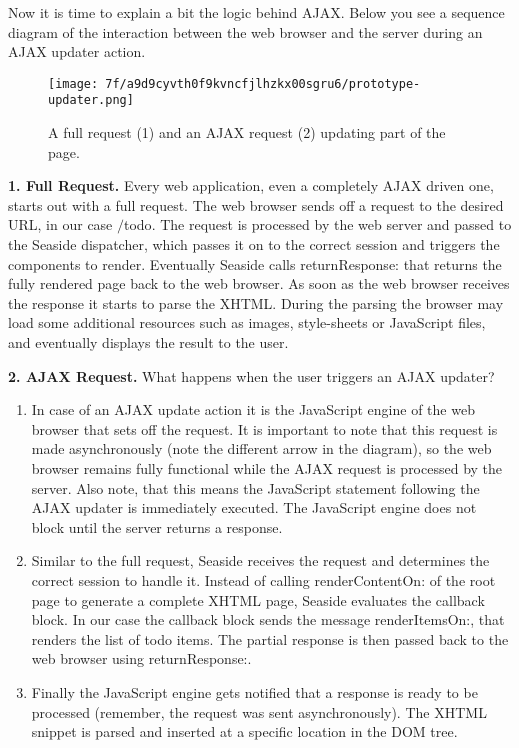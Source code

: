 \documentclass[a4paper,10pt,twoside]{book}
\newcommand{\ct}[1]{{\small\ttfamily\textup{#1}}}
\begin{document}
Now it is time to explain a bit the logic behind AJAX. Below you see a sequence diagram of the interaction between the web browser and the server during an AJAX updater action.

\begin{figure}[h!tbp]
	\begin{center}
		\texttt{[image: 7f/a9d9cyvth0f9kvncfjlhzkx00sgru6/prototype-updater.png]}
		\caption{A full request (1) and an AJAX request (2) updating part of the page.\label{book:web20:scriptaculous:ajax:background:prototypeupdater}}
	\end{center}
\end{figure}


\textbf{1. Full Request.} Every web application, even a completely AJAX driven one, starts out with a full request. The web browser sends off a request to the desired URL, in our case \ct{$/$todo}. The request is processed by the web server and passed to the Seaside dispatcher, which passes it on to the correct session and triggers the components to render. Eventually Seaside calls \ct{returnResponse:} that returns the fully rendered page back to the web browser. As soon as the web browser receives the response it starts to parse the XHTML. During the parsing the browser may load some additional resources such as images, style-sheets or JavaScript files, and eventually displays the result to the user.

\textbf{2. AJAX Request.} What happens when the user triggers an AJAX updater?

\begin{enumerate}
\item  In case of an AJAX update action it is the JavaScript engine of the web browser that sets off the request. It is important to note that this request is made asynchronously (note the different arrow in the diagram), so the web browser remains fully functional while the AJAX request is processed by the server. Also note, that this means the JavaScript statement following the AJAX updater is immediately executed. The JavaScript engine does not block until the server returns a response.
\item  Similar to the full request, Seaside receives the request and determines the correct session to handle it. Instead of calling \ct{renderContentOn:} of the root page to generate a complete XHTML page, Seaside evaluates the callback block. In our case the callback block sends the message \ct{renderItemsOn:}, that renders the list of todo items. The partial response is then passed back to the web browser using \ct{returnResponse:}.
\item  Finally the JavaScript engine gets notified that a response is ready to be processed (remember, the request was sent asynchronously). The XHTML snippet is parsed and inserted at a specific location in the DOM tree.
\end{enumerate}
\end{document}
